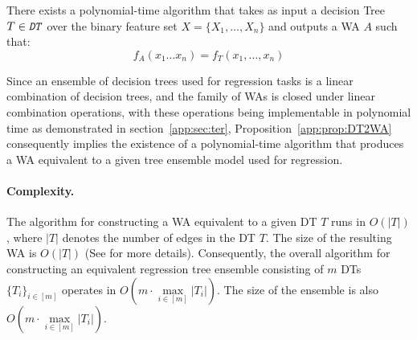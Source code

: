 
\begin{proposition} \label{app:prop:DT2WA}
    There exists a polynomial-time algorithm that takes as input a decision Tree $T \in \texttt{\emph{DT}}$ over the binary feature set $X = \{X_{1}, \ldots, X_{n} \}$ and outputs a WA $A$ such that:
     $$f_{A}(x_{1}\ldots x_{n}) = f_{T}(x_{1}, \ldots, x_{n} )$$
\end{proposition}


Since an ensemble of decision trees used for regression tasks is a linear combination of decision trees, and the family of WAs is closed under linear combination operations, with these operations being implementable in polynomial time as demonstrated in section~\ref{app:sec:ter}, Proposition~\ref{app:prop:DT2WA} consequently implies the existence of a polynomial-time algorithm that produces a WA equivalent to a given tree ensemble model used for regression.


\paragraph{Complexity.} The algorithm for constructing a WA equivalent to a given DT $T$ runs in $O(|T|)$, where $|T|$ denotes the number of edges in the DT $T$. The size of the resulting WA is $O(|T|)$ (See \cite{marzouk24a} for more details). Consequently, the overall algorithm for constructing an equivalent regression tree ensemble consisting of $m$ DTs $\{T_{i}\}_{i \in [m]}$ operates in $O(m \cdot \max\limits_{i \in [m]} |T_{i}|)$. The size of the ensemble is also $O(m \cdot \max\limits_{i \in [m]} |T_{i}|)$.




